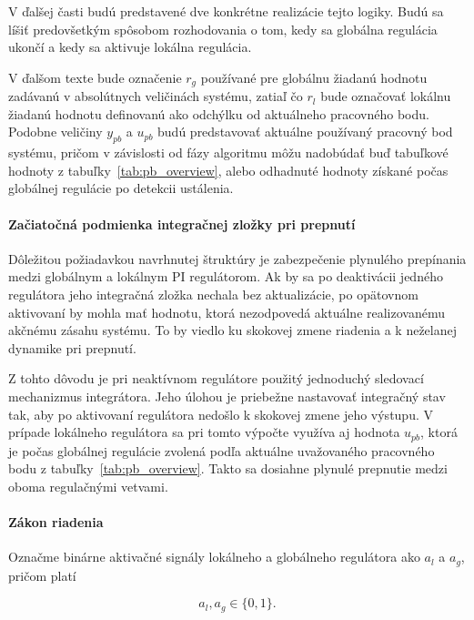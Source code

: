 V ďalšej časti budú predstavené dve konkrétne realizácie tejto logiky.
Budú sa líšiť predovšetkým spôsobom rozhodovania o tom,
kedy sa globálna regulácia ukončí
a kedy sa aktivuje lokálna regulácia.

V ďalšom texte bude označenie $r_g$ používané pre globálnu žiadanú hodnotu
zadávanú v absolútnych veličinách systému, zatiaľ čo $r_l$ bude označovať
lokálnu žiadanú hodnotu definovanú ako odchýlku od aktuálneho pracovného bodu.
Podobne veličiny $y_{pb}$ a $u_{pb}$ budú predstavovať aktuálne používaný
pracovný bod systému, pričom v závislosti od fázy algoritmu môžu nadobúdať buď
tabuľkové hodnoty z tabuľky~\ref{tab:pb_overview}, alebo odhadnuté hodnoty
získané počas globálnej regulácie po detekcii ustálenia.

\paragraph{Začiatočná podmienka integračnej zložky pri prepnutí}   

Dôležitou požiadavkou navrhnutej štruktúry
je zabezpečenie plynulého prepínania medzi globálnym
a lokálnym PI regulátorom.
Ak by sa po deaktivácii jedného regulátora
jeho integračná zložka nechala bez aktualizácie,
po opätovnom aktivovaní by mohla mať hodnotu,
ktorá nezodpovedá aktuálne realizovanému akčnému zásahu systému.
To by viedlo ku skokovej zmene riadenia
a k neželanej dynamike pri prepnutí.

Z tohto dôvodu je pri neaktívnom regulátore
použitý jednoduchý sledovací mechanizmus integrátora.
Jeho úlohou je priebežne nastavovať integračný stav tak,
aby po aktivovaní regulátora nedošlo
k skokovej zmene jeho výstupu.
V prípade lokálneho regulátora sa pri tomto výpočte
využíva aj hodnota $u_{pb}$,
ktorá je počas globálnej regulácie zvolená
podľa aktuálne uvažovaného pracovného bodu
z tabuľky~\ref{tab:pb_overview}.
Takto sa dosiahne plynulé prepnutie medzi oboma regulačnými vetvami.

\paragraph{Zákon riadenia}

Označme binárne aktivačné signály lokálneho a globálneho regulátora ako
$a_l$ a $a_g$, pričom platí

\begin{equation}
a_l, a_g \in \{0,1\}.
\label{eq:pi_switch_activity_condition}
\end{equation}

